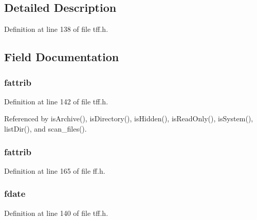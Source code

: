 \subsection{Detailed Description}


Definition at line 138 of file tff.\-h.



\subsection{Field Documentation}
\hypertarget{struct_f_i_l_i_n_f_o_af5fa689ce021720b227a97f69eb06dfe}{
\subsubsection[{fattrib}]{ fattrib}}\label{struct_f_i_l_i_n_f_o_af5fa689ce021720b227a97f69eb06dfe}


Definition at line 142 of file tff.\-h.



Referenced by is\-Archive(), is\-Directory(), is\-Hidden(), is\-Read\-Only(), is\-System(), list\-Dir(), and scan\-\_\-files().

\hypertarget{struct_f_i_l_i_n_f_o_a5db0f68a162fff8361a03823cb0e5e75}{
\subsubsection[{fattrib}]{ fattrib}}\label{struct_f_i_l_i_n_f_o_a5db0f68a162fff8361a03823cb0e5e75}


Definition at line 165 of file ff.\-h.

\hypertarget{struct_f_i_l_i_n_f_o_a9478c5225c4f3a09d739dbc2245a72fd}{
\subsubsection[{fdate}]{ fdate}}\label{struct_f_i_l_i_n_f_o_a9478c5225c4f3a09d739dbc2245a72fd}


Definition at line 140 of file tff.\-h.



